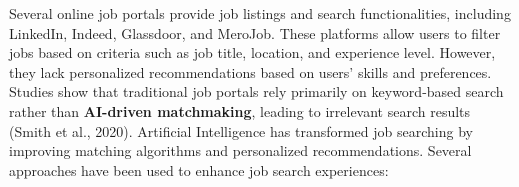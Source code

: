 \documentclass[a4paper,12pt]{report}
\begin{document}
        Several online job portals provide job listings and search functionalities, including LinkedIn, Indeed, Glassdoor, and MeroJob. These platforms allow users to filter jobs based on criteria such as job title, location, and experience level. However, they lack personalized recommendations based on users’ skills and preferences. Studies show that traditional job portals rely primarily on keyword-based search rather than \textbf{AI-driven matchmaking}, leading to irrelevant search results (Smith et al., 2020).
        Artificial Intelligence has transformed job searching by improving matching algorithms and personalized recommendations. Several approaches have been used to enhance job search experiences:

        
\end{document}
